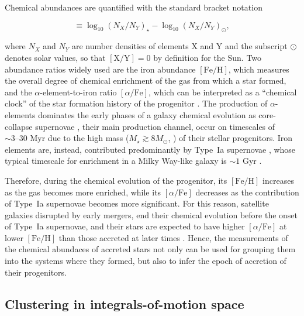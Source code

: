 Chemical abundances are quantified with the standard bracket notation

\begin{equation}
    [\mathrm{X/Y}] \equiv \log_{10}(N_X/N_Y)_\star - \log_{10}(N_X/N_Y)_\odot,
\end{equation}

where $N_X$ and $N_Y$ are number densities of elements X and Y and the subscript $\odot$ denotes solar values,
so that $[\mathrm{X/Y}]=0$ by definition for the Sun.
Two abundance ratios widely used are the iron abundance $[\mathrm{Fe/H}]$, which measures the
overall degree of chemical enrichment of the gas from which a star formed, and the $\alpha$-element-to-iron
ratio $[\alpha/\mathrm{Fe}]$, which can be interpreted as a ``chemical clock'' of the star formation history of the
progenitor \citep{Font2006a}. The production of $\alpha$-elements dominates the early phases of a galaxy chemical evolution as
core-collapse supernovae \citep{Portinari1998,Kobayashi2006}, their main production channel, occur on timescales
of $\sim 3\text{--}30$ Myr due to the high mass ($M_\star \gtrsim 8 M_\odot$, \citep{Portinari1998}) of their stellar progenitors. 
Iron  elements are, instead, contributed predominantly by Type~Ia supernovae \citep{Iwamoto1999}, whose
typical timescale for enrichment in a Milky Way-like galaxy is $\sim 1$ Gyr \citep{Matteucci2009}. 

Therefore, during the chemical evolution of the progenitor, its $[\mathrm{Fe/H}]$
increases as the gas becomes more enriched, while its $[\alpha/\mathrm{Fe}]$ decreases as the contribution of
Type~Ia supernovae becomes more significant. For this reason, satellite galaxies disrupted by early mergers, end their chemical evolution
before the onset of Type~Ia supernovae, and their stars are expected to have higher $[\alpha/\mathrm{Fe}]$ at lower $[\mathrm{Fe/H}]$
than those accreted at later times \citep{Font2006a}. Hence, the measurements of the chemical abundaces of accreted stars not only can
be used for grouping them into the systems where they formed, but also to infer the epoch of accretion of their progenitors.


\subsection{Clustering in integrals-of-motion space}

